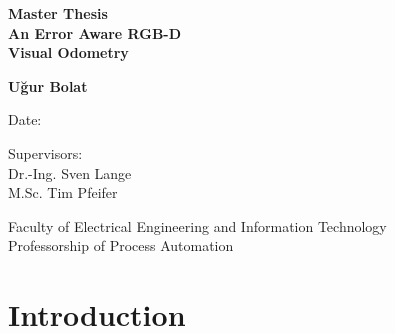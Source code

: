 \documentclass[a4paper]{report}
\numberwithin{figure}{section}
\begin{document}
\begin{titlepage}
\begin{center}


\vspace{1.5cm}


{\Huge \textbf{Master Thesis}}\\
\vspace{0.5cm}
{\huge \textbf{An Error Aware RGB-D \\Visual Odometry}}


\vspace{2.5cm}

{\huge \textbf{U\u{g}ur Bolat}}

\vfill

Date:

\vspace{1.2cm}

Supervisors: \\
Dr.-Ing. Sven Lange \\
M.Sc. Tim Pfeifer

\vspace{0.8cm}

Faculty of Electrical Engineering and Information Technology\\
Professorship of Process Automation

\end{center}
\end{titlepage}

\tableofcontents
\newpage
\listoffigures
\listoftables
\newpage
\printglossary[type=\acronymtype,title={Abbreviations}]
\newpage


\begin{abstract}


\end{abstract}

\newpage

\chapter{Introduction} \label{cp_intro}


\newpage

\end{document}
